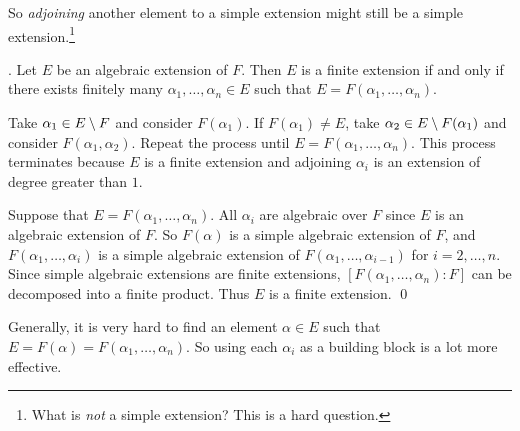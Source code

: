 So \textit{adjoining} another element to a simple extension might still be a simple extension.\footnote{What is \textit{not} a simple extension? This is a hard question.}

\pagebreak

\thm. Let \(E\) be an algebraic extension of \(F\). Then \(E\) is a finite extension if and only if there exists finitely many \(\alpha_1, \dots, \alpha_n \in E\) such that \(E = F(\alpha_1, \dots, \alpha_n)\).

\pf \note{\mimp} Take \(\alpha_1 \in E \setminus F\) and consider \(F(\alpha_1)\). If \(F(\alpha_1) \neq E\), take \(\alpha_2 \in E \setminus F(\alpha_1)\) and consider \(F(\alpha_1, \alpha_2)\). Repeat the process until \(E = F(\alpha_1, \dots, \alpha_n)\). This process terminates because \(E\) is a finite extension and adjoining \(\alpha_i\) is an extension of degree greater than \(1\).

\note{\mimpd} Suppose that \(E = F(\alpha_1, \dots, \alpha_n)\). All \(\alpha_i\) are algebraic over \(F\) since \(E\) is an algebraic extension of \(F\). So \(F(\alpha)\) is a simple algebraic extension of \(F\), and \(F(\alpha_1, \dots, \alpha_{i})\) is a simple algebraic extension of \(F(\alpha_1, \dots, \alpha_{i - 1})\) for \(i = 2, \dots, n\). Since simple algebraic extensions are finite extensions, \([F(\alpha_1, \dots, \alpha_n) : F]\) can be decomposed into a finite product. Thus \(E\) is a finite extension. \qed

Generally, it is very hard to find an element \(\alpha \in E\) such that \(E = F(\alpha) = F(\alpha_1, \dots, \alpha_n)\). So using each \(\alpha_i\) as a building block is a lot more effective.

\pagebreak
